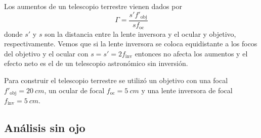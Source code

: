 \documentclass[12pt]{article}
\numberwithin{table}{section}
\numberwithin{figure}{section}
\numberwithin{equation}{section}
\begin{document}
Los aumentos de un telescopio terrestre vienen dados por 
\begin{equation} \label{eqn:aumentos terrestre}
	\Gamma = \frac{s'f'_\text{obj}}{sf_\text{oc}}
\end{equation}
donde \( s' \) y \( s \) son la distancia entre la lente inversora y el ocular y objetivo, respectivamente. Vemos que si la lente inversora se coloca equidistante a los focos del objetivo y el ocular con \( s = s' = 2f_\text{inv} \) entonces no afecta los aumentos y el efecto neto es el de un telescopio astronómico sin inversión.


Para construir el telescopio terrestre se utilizó un objetivo con una focal \( f'_\text{obj} = \SI{20}{cm} \), un ocular de focal \( f_\text{oc} = \SI{5}{cm} \) y una lente inversora de focal \( f_\text{inv} = \SI{5}{cm} \).

\subsection{Análisis sin ojo}
\end{document}

